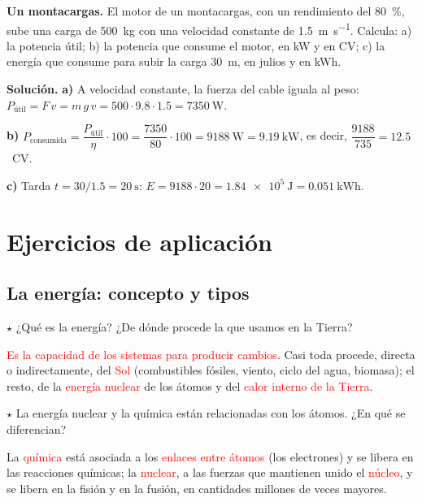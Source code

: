 \begin{example}
    \textbf{Un montacargas.} El motor de un montacargas, con un rendimiento del \qty{80}{\percent}, sube una carga de \qty{500}{\kg} con
    una velocidad constante de \qty{1.5}{\m\per\s}. Calcula: a) la potencia útil; b) la potencia que consume el motor, en kW y en CV;
    c) la energía que consume para subir la carga \qty{30}{\m}, en julios y en kWh.

    \textbf{Solución.} \textbf{a)} A velocidad constante, la fuerza del cable iguala al peso: \(P_{\text{útil}} = F\,v = m\,g\,v =
    500 \cdot \num{9.8} \cdot \num{1.5} = \qty{7350}{\watt}\).

    \textbf{b)} \(P_{\text{consumida}} = \dfrac{P_{\text{útil}}}{\eta} \cdot 100 = \dfrac{7350}{80} \cdot 100 = \qty{9188}{\watt} =
    \qty{9.19}{\kilo\watt}\), es decir, \(\dfrac{9188}{735} = \num{12.5}\)~CV.

    \textbf{c)} Tarda \(t = 30/\num{1.5} = \qty{20}{\s}\): \(E = 9188 \cdot 20 = \qty{1.84e5}{\joule} = \qty{0.051}{\kilo\watt\hour}\).
\end{example}

\section{Ejercicios de aplicación}\label{sec:ud12-aplicacion}

\subsection{La energía: concepto y tipos}

\begin{exercise}
    \(\star\) ¿Qué es la energía? ¿De dónde procede la que usamos en la Tierra?
    \begin{solu}
        \textcolor{red}{Es la capacidad de los sistemas para producir cambios}. Casi toda procede, directa o indirectamente, del
        \textcolor{red}{Sol} (combustibles fósiles, viento, ciclo del agua, biomasa); el resto, de la \textcolor{red}{energía nuclear}
        de los átomos y del \textcolor{red}{calor interno de la Tierra}.
    \end{solu}
\end{exercise}

\begin{exercise}
    \(\star\) La energía nuclear y la química están relacionadas con los átomos. ¿En qué se diferencian?
    \begin{solu}
        La \textcolor{red}{química} está asociada a los \textcolor{red}{enlaces entre átomos} (los electrones) y se libera en las
        reacciones químicas; la \textcolor{red}{nuclear}, a las fuerzas que mantienen unido el \textcolor{red}{núcleo}, y se libera en la
        fisión y en la fusión, en cantidades millones de veces mayores.
    \end{solu}
\end{exercise}

